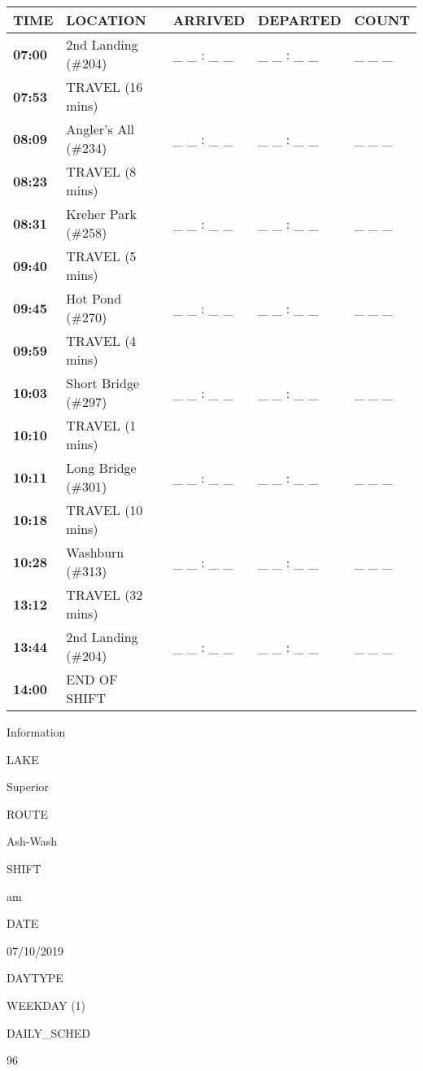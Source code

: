 \documentclass[]{article}
\begin{document}
\begin{tabular}{>{\bfseries}lllll}
\toprule
\textbf{TIME} & \textbf{LOCATION} & \textbf{ARRIVED} & \textbf{DEPARTED} & \textbf{COUNT}\\
\midrule
07:00 & 2nd Landing (\#204) & \_ \_ : \_ \_ & \_ \_ : \_ \_ & \_ \_ \_\\
07:53 & TRAVEL (16 mins) &  &  & \\
08:09 & Angler's All (\#234) & \_ \_ : \_ \_ & \_ \_ : \_ \_ & \_ \_ \_\\
08:23 & TRAVEL (8 mins) &  &  & \\
08:31 & Kreher Park (\#258) & \_ \_ : \_ \_ & \_ \_ : \_ \_ & \_ \_ \_\\
09:40 & TRAVEL (5 mins) &  &  & \\
09:45 & Hot Pond (\#270) & \_ \_ : \_ \_ & \_ \_ : \_ \_ & \_ \_ \_\\
09:59 & TRAVEL (4 mins) &  &  & \\
10:03 & Short Bridge (\#297) & \_ \_ : \_ \_ & \_ \_ : \_ \_ & \_ \_ \_\\
10:10 & TRAVEL (1 mins) &  &  & \\
10:11 & Long Bridge (\#301) & \_ \_ : \_ \_ & \_ \_ : \_ \_ & \_ \_ \_\\
10:18 & TRAVEL (10 mins) &  &  & \\
10:28 & Washburn (\#313) & \_ \_ : \_ \_ & \_ \_ : \_ \_ & \_ \_ \_\\
13:12 & TRAVEL (32 mins) &  &  & \\
13:44 & 2nd Landing (\#204) & \_ \_ : \_ \_ & \_ \_ : \_ \_ & \_ \_ \_\\
14:00 & END OF SHIFT &  &  & \\
\bottomrule
\end{tabular}\newpage

Information

LAKE

Superior

ROUTE

Ash-Wash

SHIFT

am

DATE

07/10/2019

DAYTYPE

WEEKDAY (1)

DAILY\_SCHED

96

\vspace{24pt}
\end{document}
